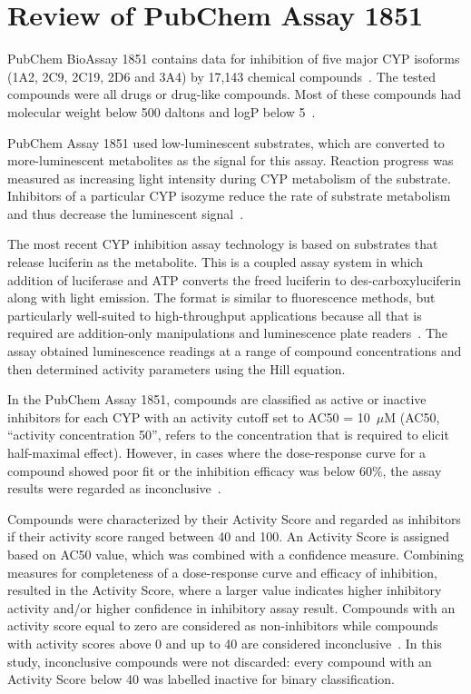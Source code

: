 \section{Review of PubChem Assay 1851}
  

PubChem BioAssay 1851 contains data for inhibition of five major CYP isoforms (1A2, 2C9, 2C19, 2D6 and 3A4) by 17,143 chemical compounds~\cite{Veith2009}. The tested compounds were all drugs or drug-like compounds. Most of these compounds had molecular weight below 500 daltons and logP below 5~\cite{Lapins2013}.

PubChem Assay 1851 used low-luminescent substrates, which are converted to more-luminescent metabolites as the signal for this assay. Reaction progress was measured as increasing light intensity during CYP metabolism of the substrate. Inhibitors of a particular CYP isozyme reduce the rate of substrate metabolism and thus decrease the luminescent signal~\cite{Zlokarnik2005}.

The most recent CYP inhibition assay technology is based on substrates that release luciferin as the metabolite. This is a coupled assay system in which addition of luciferase and ATP converts the freed luciferin to des-carboxyluciferin along with light emission. The format is similar to fluorescence methods, but particularly well-suited to high-throughput applications because all that is required are addition-only manipulations and luminescence plate readers~\cite{Zlokarnik2005}. The assay obtained luminescence readings at a range of compound concentrations and then determined activity parameters using the Hill equation.

In the PubChem Assay 1851, compounds are classified as active or inactive inhibitors for each CYP with an activity cutoff set to AC50 = 10~$\mu$M (AC50, “activity concentration 50”, refers to the concentration that is required to elicit half-maximal effect). However, in cases where the dose-response curve for a compound showed poor fit or the inhibition efficacy was below 60\%, the assay results were regarded as inconclusive~\cite{Veith2009}.

Compounds were characterized by their Activity Score and regarded as inhibitors if their activity score ranged between 40 and 100. An Activity Score is assigned based on AC50 value, which was combined with a confidence measure. Combining measures for completeness of a dose-response curve and efficacy of inhibition, resulted in the Activity Score, where a larger value indicates higher inhibitory activity and/or higher confidence in inhibitory assay result. Compounds with an activity score equal to zero are considered as non-inhibitors while compounds with activity scores above 0 and up to 40 are considered inconclusive~\cite{Lapins2013}. In this study, inconclusive compounds were not discarded: every compound with an Activity Score below 40 was labelled inactive for binary classification.

